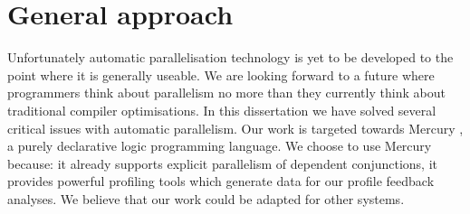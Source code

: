 

\section{General approach}
\label{sec:intro_general_approach}

Unfortunately automatic parallelisation technology is yet to be developed to the
point where it is generally useable.
We are looking forward to a future where programmers think about
parallelism no more than they currently think about traditional compiler
optimisations.
In this dissertation we have solved several critical issues with automatic
parallelism.
Our work is targeted towards Mercury \citep*{mercury_jlp},
a purely declarative logic programming language.
We choose to use Mercury because:
it already supports explicit parallelism of dependent conjunctions,
it provides powerful profiling tools which generate data for our profile
feedback analyses.
We believe that our work could be adapted for other systems.


